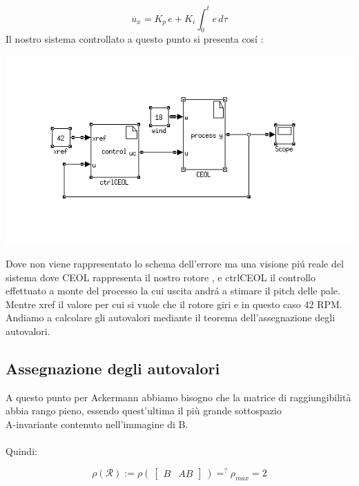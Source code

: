 \documentclass[a4paper,13pt]{article}
\begin{document}
	
\begin{equation*}
	u_x=K_{p}\,e+K_{i}\int_{0}^{t} e \, d\tau              %
\end{equation*}	
Il nostro sistema controllato a questo punto si presenta cos\'i :

\begin{center}
\includegraphics[scale=0.6]{eolcont.png}
\end{center}

Dove non viene rappresentato lo schema dell'errore ma una visione pi\'u reale del sistema
dove CEOL rappresenta il nostro rotore , e ctrlCEOL il controllo effettuato a monte del processo la cui uscita andr\'a a stimare il pitch delle pale.\\
Mentre xref il valore per cui si vuole che il rotore giri e in questo caso 42 RPM.
Andiamo a calcolare gli autovalori mediante il teorema dell'assegnazione degli autovalori.
\subsection{Assegnazione degli autovalori}
A questo punto per Ackermann abbiamo bisogno che la matrice di raggiungibilità abbia rango pieno, essendo quest'ultima 	il più grande sottospazio \\A-invariante contenuto nell'immagine di B.\\ \\
	Quindi:
	
\begin{equation*}
	\rho(\mathcal{R}):=
\rho(\:\begin{bmatrix}

	B&AB

\end{bmatrix}\:)=^{?}\rho_{max}=2
\end{equation*}
\end{document}
